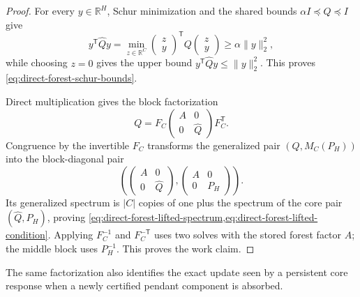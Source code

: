 \begin{proof}
For every $y\in\mathbb R^H$, Schur minimization and the shared bounds
$\alpha I\preceq Q\preceq I$ give
\begin{equation*}
 y^\mathsf T\widehat Qy
 =\min_{z\in\mathbb R^C}
  \begin{pmatrix}z\\y\end{pmatrix}^{\!\mathsf T}
  Q
  \begin{pmatrix}z\\y\end{pmatrix}
 \geq\alpha\|y\|_2^2,
\end{equation*}
while choosing $z=0$ gives the upper bound
$y^\mathsf T\widehat Qy\leq\|y\|_2^2$.  This proves
\cref{eq:direct-forest-schur-bounds}.

Direct multiplication gives the block factorization
\begin{equation}
 Q=F_C
 \begin{pmatrix}A&0\\0&\widehat Q\end{pmatrix}F_C^\mathsf T.
 \label{eq:direct-forest-block-factorization}
\end{equation}
Congruence by the invertible $F_C$ transforms the generalized pair
$(Q,M_C(P_H))$ into the block-diagonal pair
\begin{equation*}
 \left(
  \begin{pmatrix}A&0\\0&\widehat Q\end{pmatrix},
  \begin{pmatrix}A&0\\0&P_H\end{pmatrix}
 \right).
\end{equation*}
Its generalized spectrum is $|C|$ copies of one plus the spectrum of the core
pair $(\widehat Q,P_H)$, proving
\cref{eq:direct-forest-lifted-spectrum,eq:direct-forest-lifted-condition}.
Applying $F_C^{-1}$ and $F_C^{-\mathsf T}$ uses two solves with the stored
forest factor $A$; the middle block uses $P_H^{-1}$.  This proves the work
claim.
\end{proof}

The same factorization also identifies the exact update seen by a persistent
core response when a newly certified pendant component is absorbed.

